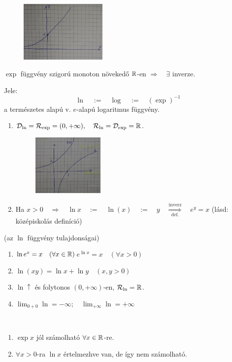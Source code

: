\documentclass[a4paper,11.5pt]{article}
\begin{document}
	\begin{figure}[H]
		\centering
		\includegraphics[height=3cm]{kepek/03ea_7.jpg}
		\caption{}\label{}
	\end{figure}
	\begin{definition}
		$\exp$ függvény szigorú monoton növekedő $\mathbb{R}$-en \quad $\Rightarrow \quad \exists$ inverze. 
		
		Jele: \[\ln\quad :=\quad \log\quad :=\quad (\exp)^{-1}\]
		a természetes alapú v. $e$-alapú logaritmus függvény.
	\end{definition}
	\begin{note}
		\begin{enumerate}
			\item $\mathcal{D}_{\ln}=\mathcal{R}_{\exp}=(0,+\infty),\quad \mathcal{R}_{\ln}=\mathcal{D}_{\exp}=\mathbb{R}$.
			
			\begin{figure}[H]
				\centering
				\includegraphics[height=3cm]{kepek/03ea_8.jpg}
				\caption{}\label{}
			\end{figure}
			\item Ha $x>0\quad \Rightarrow\quad \ln x\quad :=\quad \ln(x)\quad :=\quad y \quad \overset{\text{inverz}}{\underset{\text{def.}}{\Rightarrow}}\quad e^y=x$ \quad (lásd: középiskolás definíció)
		\end{enumerate}
	\end{note}
	\begin{theorem}
		(az $\ln$ függvény tulajdonságai)
		\begin{enumerate}
			\item $\ln e^x=x\quad (\forall x \in\mathbb{R})$\quad  $e^{\ln x}=x\quad (\forall x>0)$
			\item $\ln(xy)=\ln x+\ln y\quad (x,y>0)$
			\item $\ln\uparrow$ és folytonos $(0,+\infty)$-en, $\mathcal{R}_{\ln}=\mathbb{R}$.
			\item $\displaystyle \lim_{0+0}\ln=-\infty; \quad \lim_{+\infty}\ln=+\infty$
		\end{enumerate}
	\end{theorem}
	\begin{note}\ 
		
		\begin{enumerate}
			\item $\exp x$ jól számolható $\forall x\in\mathbb{R}$-re.
			\item $\forall x>0$-ra $\ln x$ értelmezhve van, de így nem számolható.
		\end{enumerate}
	\end{note}
\end{document}
